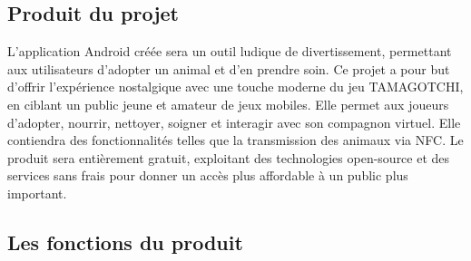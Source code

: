 \documentclass{cahier_des_charges}
\begin{document}
\subsection{Produit du projet}
L’application Android créée sera un outil ludique de divertissement, permettant aux utilisateurs d’adopter un animal et d’en prendre soin. Ce projet a pour but d’offrir l’expérience nostalgique avec une touche moderne du jeu TAMAGOTCHI, en ciblant un public jeune et amateur de jeux mobiles. Elle permet aux joueurs d’adopter, nourrir, nettoyer, soigner et interagir avec son compagnon virtuel. Elle contiendra des fonctionnalités telles que la transmission des animaux via NFC. Le produit sera entièrement gratuit, exploitant des technologies open-source et des services sans frais pour donner un accès plus affordable à un public plus important.
\subsection{Les fonctions du produit}
\end{document}
